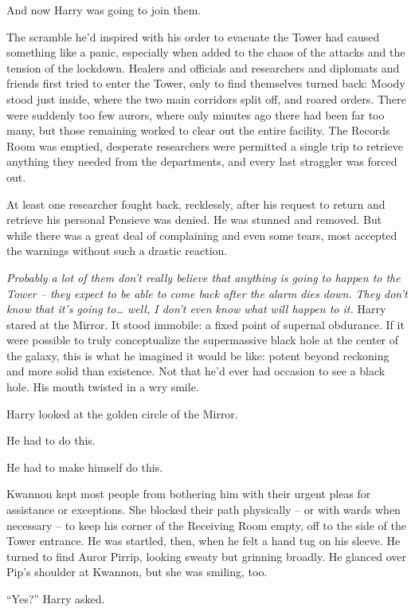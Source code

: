 And now Harry was going to join them.

The scramble he'd inspired with his order to evacuate the Tower had
caused something like a panic, especially when added to the chaos of the
attacks and the tension of the lockdown. Healers and officials and
researchers and diplomats and friends first tried to enter the Tower,
only to find themselves turned back: Moody stood just inside, where the
two main corridors split off, and roared orders. There were suddenly too
few aurors, where only minutes ago there had been far too many, but
those remaining worked to clear out the entire facility. The Records
Room was emptied, desperate researchers were permitted a single trip to
retrieve anything they needed from the departments, and every last
straggler was forced out.

At least one researcher fought back, recklessly, after his request to
return and retrieve his personal Pensieve was denied. He was stunned and
removed. But while there was a great deal of complaining and even some
tears, most accepted the warnings without such a drastic reaction.

\emph{Probably a lot of them don't really believe that anything is going
to happen to the Tower -- they expect to be able to come back after the
alarm dies down. They don't know that it's going to\ldots{} well, I
don't even know what will happen to it.} Harry stared at the Mirror. It
stood immobile: a fixed point of supernal obdurance. If it were possible
to truly conceptualize the supermassive black hole at the center of the
galaxy, this is what he imagined it would be like: potent beyond
reckoning and more solid than existence. Not that he'd ever had occasion
to see a black hole. His mouth twisted in a wry smile.

Harry looked at the golden circle of the Mirror.

He had to do this.

He had to make himself do this.

Kwannon kept most people from bothering him with their urgent pleas for
assistance or exceptions. She blocked their path physically -- or with
wards when necessary -- to keep his corner of the Receiving Room empty,
off to the side of the Tower entrance. He was startled, then, when he
felt a hand tug on his sleeve. He turned to find Auror Pirrip, looking
sweaty but grinning broadly. He glanced over Pip's shoulder at Kwannon,
but she was smiling, too.

``Yes?'' Harry asked.

